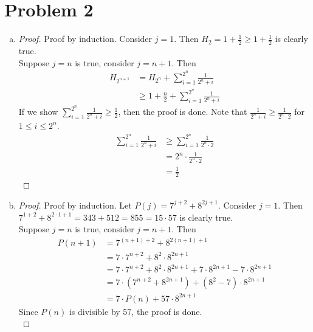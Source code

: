 \section*{Problem 2}
	\begin{enumerate} [(a)]
		\item
			\begin{proof}
				Proof by induction. Consider $j = 1$. Then $H_{2} = 1 + \frac{1}{2} \geq 1 + \frac{1}{2}$ is clearly true.\\
				Suppose $j = n$ is true, consider $j = n + 1$. Then
				\begin{align*}
					H_{2^{n + 1}} &= H_{2^n} + \sum\limits_{i=1}^{2^n} \frac{1}{2^n + i}\\
					&\geq 1 + \frac{n}{2} + \sum\limits_{i=1}^{2^n} \frac{1}{2^n + i}
				\end{align*}
				If we show $\sum\limits_{i=1}^{2^n} \frac{1}{2^n + i} \geq \frac{1}{2}$, then the proof is done. Note that $\frac{1}{2^n + i} \geq \frac{1}{2^n\cdot 2}$ for $1 \leq i \leq 2^n$.
				\begin{align*}
					\sum\limits_{i=1}^{2^n} \frac{1}{2^n + i} &\geq \sum\limits_{i=1}^{2^n} \frac{1}{2^n\cdot2}\\
					&= 2^n\cdot\frac{1}{2^n\cdot 2}\\
					&= \frac{1}{2}
				\end{align*}
			\end{proof}
		\item 
			\begin{proof}
				Proof by induction. Let $P(j) = 7^{j + 2} + 8^{2j + 1}$. Consider $j = 1$. Then $7^{1 + 2} + 8^{2\cdot1 + 1} = 343 + 512 = 855 = 15\cdot57$ is clearly true.\\
				Suppose $j = n$ is true, consider $j = n + 1$. Then
				\begin{align*}
					P(n + 1) &= 7^{(n + 1) + 2} + 8^{2(n + 1) + 1}\\
					&= 7\cdot7^{n + 2} + 8^2\cdot8^{2n + 1}\\
					&= 7\cdot7^{n + 2} + 8^2\cdot8^{2n + 1} + 7\cdot8^{2n + 1} - 7\cdot8^{2n + 1}\\
					&= 7\cdot(7^{n + 2} + 8^{2n + 1}) + (8^2 - 7)\cdot8^{2n + 1}\\
					&= 7\cdot P(n) + 57\cdot8^{2n + 1}
				\end{align*}
				Since $P(n)$ is divisible by 57, the proof is done.\\
			\end{proof}
	\end{enumerate}
	